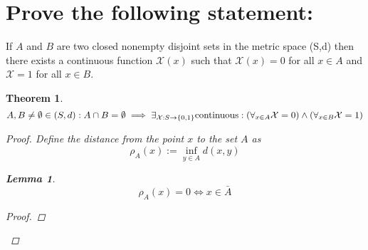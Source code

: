 \documentclass[]{article}
\newcommand{\st}{\ : \ }
\newtheorem{theorem}{Theorem}
\newtheorem{lemma}{Lemma}
\begin{document}
\section{Prove the following statement:}
If $A$ and $B$ are two closed nonempty disjoint %
sets in the metric space (S,d) then there exists a continuous function $\mathcal{X}(x)$ such that $\mathcal{X}(x) = 0$ for all $x \in A$ and $\mathcal{X} = 1$ for all $x \in B$.
\begin{theorem}
    $$A, B \neq \emptyset \in (S,d) : A \cap B = \emptyset \implies \exists_{\mathcal{X}: S \to \{0,1\}} \textnormal{continuous} : \qty( \forall_{x \in A} \mathcal{X} = 0) \land \qty(\forall_{x \in B} \mathcal{X} = 1)$$
    \begin{proof}
        Define the distance from the point $x$ to the set $A$ as 
        $$\rho_A(x) := \inf_{y\in A} d(x,y)$$
        \begin{lemma}
            $$\rho_A(x) = 0 \iff x \in \bar{A}$$
            \begin{proof}
                
            \end{proof}
        \end{lemma}
    \end{proof}
\end{theorem}






\newpage
\end{document}
